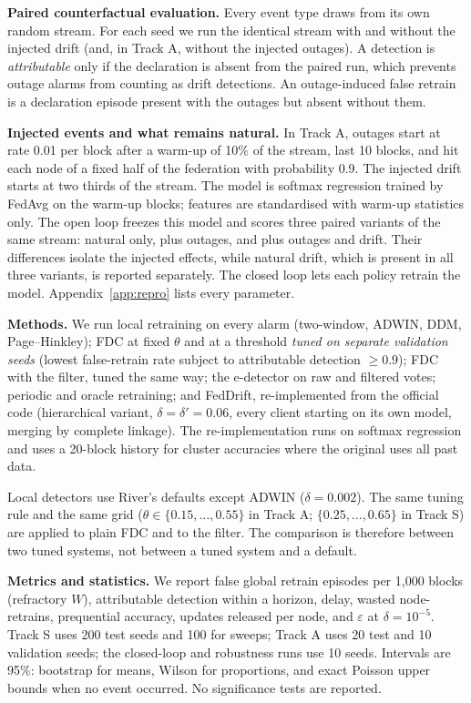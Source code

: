 \IfFileExists{IEEEtran.cls}{\documentclass[journal]{IEEEtran}\newcommand{\ieeemode}{}}{\documentclass[10pt,twocolumn,letterpaper]{article}\usepackage[margin=0.72in,columnsep=0.22in]{geometry}}
\begin{document}
\noindent\textbf{Paired counterfactual evaluation.} Every event type draws from its own random stream. For each seed we run the identical stream with and without the injected drift (and, in Track A, without the injected outages). A detection is \emph{attributable} only if the declaration is absent from the paired run, which prevents outage alarms from counting as drift detections. An outage-induced false retrain is a declaration episode present with the outages but absent without them.

\noindent\textbf{Injected events and what remains natural.} In Track A, outages start at rate 0.01 per block after a warm-up of 10\% of the stream, last 10 blocks, and hit each node of a fixed half of the federation with probability 0.9. The injected drift starts at two thirds of the stream. The model is softmax regression trained by FedAvg on the warm-up blocks; features are standardised with warm-up statistics only. The open loop freezes this model and scores three paired variants of the same stream: natural only, plus outages, and plus outages and drift. Their differences isolate the injected effects, while natural drift, which is present in all three variants, is reported separately. The closed loop lets each policy retrain the model. Appendix~\ref{app:repro} lists every parameter.

\noindent\textbf{Methods.} We run local retraining on every alarm (two-window, ADWIN, DDM, Page--Hinkley); FDC at fixed $\theta$ and at a threshold \emph{tuned on separate validation seeds} (lowest false-retrain rate subject to attributable detection $\ge0.9$); FDC with the filter, tuned the same way; the e-detector on raw and filtered votes; periodic and oracle retraining; and FedDrift, re-implemented from the official code (hierarchical variant, $\delta=\delta'=0.06$, every client starting on its own model, merging by complete linkage). The re-implementation runs on softmax regression and uses a 20-block history for cluster accuracies where the original uses all past data.

Local detectors use River's defaults except ADWIN ($\delta=0.002$). The same tuning rule and the same grid ($\theta\in\{0.15,\dots,0.55\}$ in Track A; $\{0.25,\dots,0.65\}$ in Track S) are applied to plain FDC and to the filter. The comparison is therefore between two tuned systems, not between a tuned system and a default.

\noindent\textbf{Metrics and statistics.} We report false global retrain episodes per 1,000 blocks (refractory $W$), attributable detection within a horizon, delay, wasted node-retrains, prequential accuracy, updates released per node, and $\varepsilon$ at $\delta=10^{-5}$. Track S uses 200 test seeds and 100 for sweeps; Track A uses 20 test and 10 validation seeds; the closed-loop and robustness runs use 10 seeds. Intervals are 95\%: bootstrap for means, Wilson for proportions, and exact Poisson upper bounds when no event occurred. No significance tests are reported.
\end{document}
